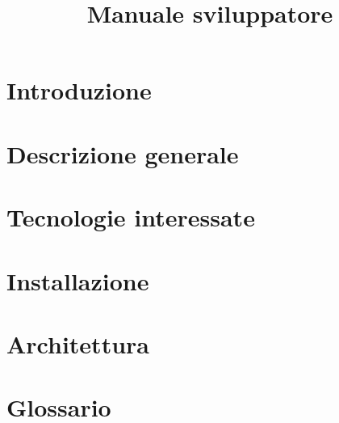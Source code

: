\documentclass{article}
\title{Manuale sviluppatore}
\begin{document}


\section{Introduzione}%
\label{sec:introduzione}


\newpage
\section{Descrizione generale}%
\label{sec:descrizione_generale}


\newpage
\section{Tecnologie interessate}%
\label{sec:tecnologie_interessate}


\newpage
\section{Installazione}%
\label{sec:installazione}


% 

\newpage
\section{Architettura}%
\label{sec:architettura}


% 

\newpage
\appendix
\section{Glossario}%
\label{sec:glossario}

\end{document}
